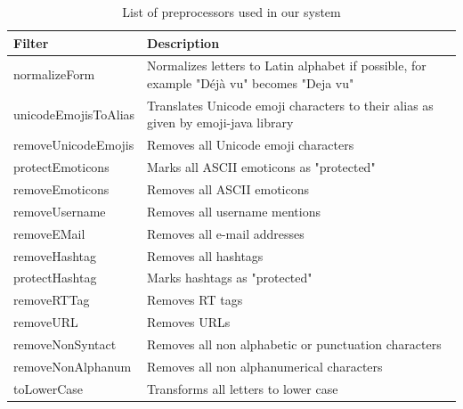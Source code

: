 \begin{table}[t]
    \setlength\tabcolsep{2pt}
    \begin{tabular}{| l | p{8.3cm} |}
        \hline
        \textbf{Filter} & \textbf{Description} \\ \hline
        normalizeForm & Normalizes letters to Latin alphabet if possible, for example "Déjà vu" becomes "Deja vu" \\ \hline
        unicodeEmojisToAlias & Translates Unicode emoji characters to their alias as given by emoji-java library \\ \hline
        removeUnicodeEmojis & Removes all Unicode emoji characters \\ \hline
        protectEmoticons & Marks all ASCII emoticons as "protected" \\ \hline
        removeEmoticons & Removes all ASCII emoticons \\ \hline
        removeUsername & Removes all username mentions \\ \hline
        removeEMail & Removes all e-mail addresses \\ \hline
        removeHashtag & Removes all hashtags \\ \hline
        protectHashtag & Marks hashtags as "protected" \\ \hline
        removeRTTag & Removes RT tags \\ \hline
        removeURL & Removes URLs \\ \hline
        removeNonSyntact & Removes all non alphabetic or punctuation characters \\ \hline
        removeNonAlphanum & Removes all non alphanumerical characters \\ \hline
        toLowerCase & Transforms all letters to lower case \\ \hline
    \end{tabular}
    \caption{List of preprocessors used in our system}
    \label{tab:master_filters}
\end{table}

